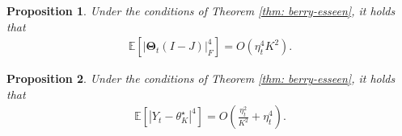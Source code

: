 \documentclass[10pt,a4paper]{amsart}
\newtheorem{proposition}{Proposition}
\def\IE{\mathbb{E}}
\def\bT{\mathbf{\Theta}}
\newcommand{\minparam}{\theta^\star_K}
\begin{document}
\begin{proposition}\label{prop:fourth-moment-difference}
  Under the conditions of Theorem \ref{thm: berry-esseen}, it holds that 
    \begin{align} \label{eq:fourth-moment-difference}
        \IE[|\bT_t(I-J)|_F^4]=O(\eta_t^4K^2).
    \end{align}
\end{proposition}

\begin{proposition}\label{prop:fourth-moment-original}
   Under the conditions of Theorem \ref{thm: berry-esseen}, it holds that
    \begin{align} \label{eq:fourth-moment-original}
        \IE[|Y_t - \minparam|^4]=O(\frac{\eta_t^2}{K^2} + \eta_t^4).
    \end{align}
\end{proposition}
\end{document}
